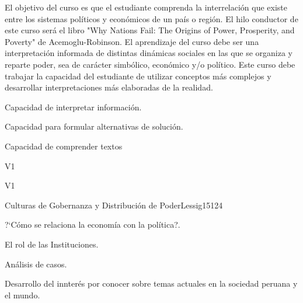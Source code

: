 \begin{syllabus}


\begin{justification}
El objetivo del curso es que el estudiante comprenda la interrelación que existe entre los sistemas políticos y económicos de un país o región. El hilo conductor de este curso será el libro "Why Nations Fail: The Origins of Power, Prosperity, and Poverty" de Acemoglu-Robinson. El aprendizaje del curso debe ser una interpretación informada de distintas dinámicas sociales en las que se organiza y reparte poder, sea de carácter simbólico, económico y/o político.  
Este curso debe trabajar la capacidad del estudiante de utilizar conceptos más complejos y desarrollar interpretaciones más elaboradas de la realidad.
\end{justification}

\begin{goals}
\item Capacidad de interpretar información.
\item Capacidad para formular alternativas de solución.
\item Capacidad de comprender textos
\end{goals}

\begin{outcomes}{V1}
      \item {}
      \item {}
      \item {}
      
\end{outcomes}

\begin{competences}{V1}
      \item {}
      \item {}
      \item {}
      \item {}
\end{competences}

\begin{unit}{Culturas de Gobernanza y Distribución de Poder}{}{Lessig15}{12}{4}
      \begin{topics}
      \item ?`Cómo se relaciona la economía con la política?.
      \item El rol de las Instituciones.
      \item Análisis de casos.
      \end{topics}
      \begin{learningoutcomes}
      \item Desarrollo del innterés por conocer sobre temas actuales en la sociedad peruana y el mundo.
      \end{learningoutcomes}
\end{unit}

\begin{coursebibliography}
\end{coursebibliography}

\end{syllabus}